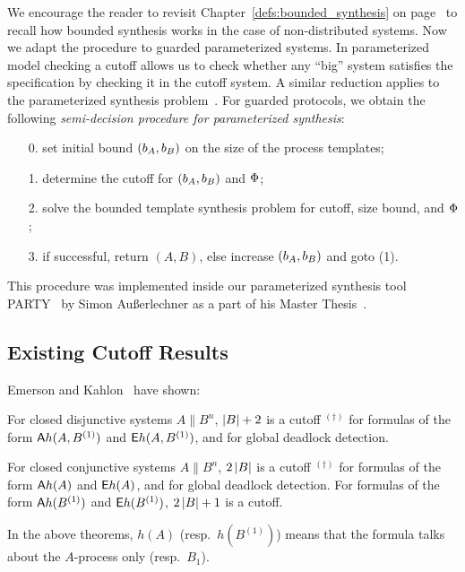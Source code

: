 We encourage the reader to revisit Chapter~\ref{defs:bounded_synthesis} on page~\pageref{page:defs:bounded_synthesis}
to recall how bounded synthesis works in the case of non-distributed systems.
Now we adapt the procedure to guarded parameterized systems.
In parameterized model checking
a cutoff allows us to check whether any ``big'' system satisfies the specification
by checking it in the cutoff system.
A similar reduction applies to the parameterized synthesis problem~\cite{JB14}.
For guarded protocols, we obtain the following 
\emph{semi-decision procedure for parameterized synthesis}:
\begin{enumerate}
  \item[0.] set initial bound $(b_A,b_B)$ on the size of the process templates;
  \item[1.] determine the cutoff for $(b_A,b_B)$ and $\Phi$;
  \item[2.] solve the bounded template synthesis problem for cutoff, size bound, and $\Phi$;
  \item[3.] if successful, return $(A,B)$, else increase $(b_A,b_B)$ and goto (1).
\end{enumerate}
This procedure was implemented inside our parameterized synthesis tool PARTY~\cite{party}
by Simon Au{\ss}erlechner as a part of his Master Thesis~\cite{SimonThesis}.

\subsection*{Existing Cutoff Results}
Emerson and Kahlon~\cite{Emerson00} have shown:

\begin{theorem} \label{thm:disj-cutoff-pairs}
    For closed disjunctive systems $A{\parallel}B^n$,
    $\left| {B} \right|+2$ is a cutoff {$^{(\dagger)}$} for formulas of the
    form ${\operatorname{\mathsf{A}}} h(A,B^{(1)})$ and ${\operatorname{\mathsf{E}}} h(A,B^{(1)})$, and for global
    deadlock detection.
\end{theorem}
 
\begin{theorem} \label{thm:conj-cutoff}
    For closed conjunctive systems ${A{\parallel}B^n}$,
    $2\left| {B} \right|$ is a cutoff {$^{(\dagger)}$} for formulas of the
    form ${\operatorname{\mathsf{A}}} h(A)$ and ${\operatorname{\mathsf{E}}} h(A)$, and for global deadlock detection.
    For formulas of the form ${\operatorname{\mathsf{A}}} h(B^{(1)})$ and ${\operatorname{\mathsf{E}}} h(B^{(1)})$,
    $2\left| {B} \right|+1$ is a cutoff.
\end{theorem}
\noindent
In the above theorems,
$h(A)$ (resp.\ $h(B^{(1)})$) means that the formula talks about the $A$-process only (resp.\ $B_1$).

